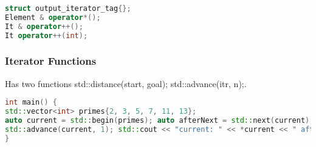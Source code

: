 \begin{lstlisting}[language=C++]
struct output_iterator_tag{};
Element & operator*();
It & operator++();
It operator++(int);
\end{lstlisting}

\subsubsection{Iterator Functions}
Has two functions std::distance(start, goal); std::advance(itr, n);.

\begin{lstlisting}[language=C++]
int main() {
std::vector<int> primes{2, 3, 5, 7, 11, 13};
auto current = std::begin(primes); auto afterNext = std::next(current); std::cout << "current: " << *current << " afterNext: " << *afterNext << '\n';
std::advance(current, 1); std::cout << "current: " << *current << " afterNext: " << *afterNext << '\n';
}
\end{lstlisting}

